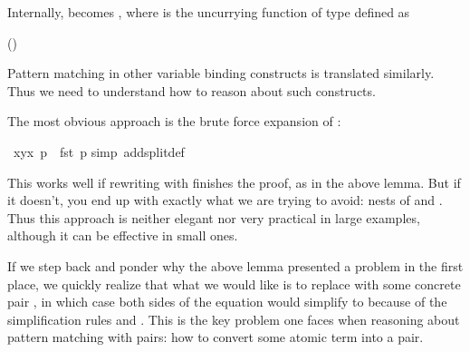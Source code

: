 \begin{isabellebody}
\begin{isamarkuptext}
Internally,  becomes , where
is the uncurrying function of type  defined as
\begin{center}
\hfill()
\end{center}
Pattern matching in
other variable binding constructs is translated similarly. Thus we need to
understand how to reason about such constructs.%
\end{isamarkuptext}%
%
%
\begin{isamarkuptext}%
The most obvious approach is the brute force expansion of :%
\end{isamarkuptext}%
\ {\isachardoublequote}{\isacharparenleft}{\isasymlambda}{\isacharparenleft}x{\isacharcomma}y{\isacharparenright}{\isachardot}x{\isacharparenright}\ p\ {\isacharequal}\ fst\ p{\isachardoublequote}\isanewline
{}simp\ add{\isacharcolon}split{\isacharunderscore}def{\isacharparenright}%
\begin{isamarkuptext}%
This works well if rewriting with  finishes the
proof, as in the above lemma. But if it doesn't, you end up with exactly what
we are trying to avoid: nests of  and . Thus this
approach is neither elegant nor very practical in large examples, although it
can be effective in small ones.

If we step back and ponder why the above lemma presented a problem in the
first place, we quickly realize that what we would like is to replace  with some concrete pair , in which case both sides of the
equation would simplify to  because of the simplification rules
 and .  This is the
key problem one faces when reasoning about pattern matching with pairs: how to
convert some atomic term into a pair.


\end{isamarkuptext}
\end{isabellebody}
